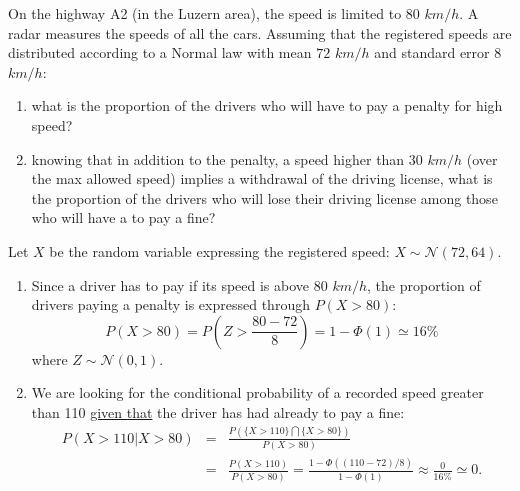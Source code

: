 \documentclass[notes=show,smaller,handout]{beamer}\usepackage[]{graphicx}\usepackage[]{color}
\begin{document}
\begin{frame}{\secname}


\begin{example}

On the highway A2 (in the Luzern area), the speed is limited to $80$ $km/h$. A radar measures the speeds of all the cars.
Assuming that the registered speeds are distributed according to a Normal law with mean $72$ $km/h$ and standard error $8$ $km/h$: \vspace{0.2cm}
\begin{enumerate}
  \item what is the proportion of the drivers who will have to pay a penalty for high speed? \vspace{0.2cm}
  \item knowing that in addition to the penalty, a speed higher than $30$ $km/h$ (over the max allowed speed) implies a withdrawal of the driving license, what is the proportion of the drivers who  will lose their driving license among those who will have a to pay a fine?
\end{enumerate}

\end{example}
\end{frame}



\begin{frame}{\secname}


\begin{example}[continued]
Let $X$ be the random variable expressing the registered speed: $X \sim \mathcal{N}(72,64)$.
\begin{enumerate}
  \item Since a driver has to pay if its speed is above  $80$ $km/h$, the proportion of drivers paying a penalty is expressed  through $P(X>80)$:
\begin{equation*}
P(X>80)= P\left(Z>\frac{80-72}{8} \right)=1-\Phi(1) \simeq 16 \%
\end{equation*}
where $Z \sim \mathcal{N}(0,1)$.
  \item We are looking for the conditional probability of a recorded speed greater than 110 \underline{given that} the driver has had already to pay a fine:
  \begin{eqnarray*}
  P(X>110 \vert X>80) &=&  \frac{P(\{X>110\} \bigcap \{X>80\})}{P(X>80)} \\
   &=& \frac{P(X>110)}{P(X>80)} = \frac{1- \Phi((110-72)/8)}{1-\Phi(1)}\approx \frac{0}{16\%}\simeq 0.
  \end{eqnarray*}


\end{enumerate}



\end{example}
\end{frame}
\end{document}

